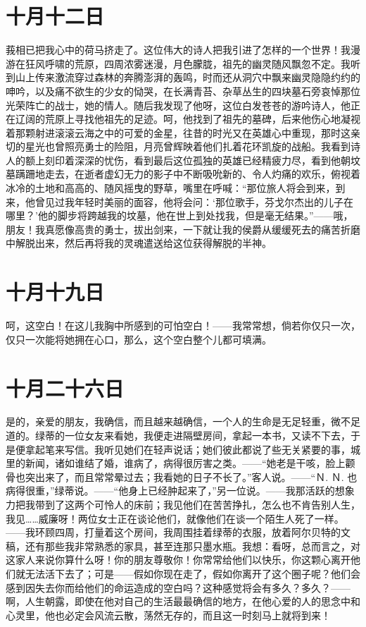 \documentclass[12pt,oneside]{book}
\begin{document}
\chapter{十月十二日}
莪相已把我心中的荷马挤走了。这位伟大的诗人把我引进了怎样的一个世界！我漫游在狂风呼啸的荒原，四周浓雾迷漫，月色朦胧，祖先的幽灵随风飘忽不定。我听到山上传来激流穿过森林的奔腾澎湃的轰鸣，时而还从洞穴中飘来幽灵隐隐约约的呻吟，以及痛不欲生的少女的恸哭，在长满青苔、杂草丛生的四块墓石旁哀悼那位光荣阵亡的战士，她的情人。随后我发现了他呀，这位白发苍苍的游吟诗人，他正在辽阔的荒原上寻找他祖先的足迹。呵，他找到了祖先的墓碑，后来他伤心地凝视着那颗射进滚滚云海之中的可爱的金星，往昔的时光又在英雄心中重现，那时这亲切的星光也曾照亮勇士的险阻，月亮曾辉映着他们扎着花环凯旋的战船。我看到诗人的额上刻印着深深的忧伤，看到最后这位孤独的英雄已经精疲力尽，看到他朝坟墓蹒跚地走去，在逝者虚幻无力的影子中不断吸吮新的、令人灼痛的欢乐，俯视着冰冷的土地和高高的、随风摇曳的野草，嘴里在呼喊：“那位旅人将会到来，到来，他曾见过我年轻时美丽的面容，他将会问：‘那位歌手，芬戈尔杰出的儿子在哪里？’他的脚步将跨越我的坟墓，他在世上到处找我，但是毫无结果。”——哦，朋友！我真愿像高贵的勇士，拔出剑来，一下就让我的侯爵从缓缓死去的痛苦折磨中解脱出来，然后再将我的灵魂遣送给这位获得解脱的半神。
　　

\chapter{十月十九日}
呵，这空白！在这儿我胸中所感到的可怕空白！——我常常想，倘若你仅只一次，仅只一次能将她拥在心口，那么，这个空白整个儿都可填满。
　　
\chapter{十月二十六日}
是的，亲爱的朋友，我确信，而且越来越确信，一个人的生命是无足轻重，微不足道的。绿蒂的一位女友来看她，我便走进隔壁房间，拿起一本书，又读不下去，于是便拿起笔来写信。我听见她们在轻声说话；她们彼此都说了些无关紧要的事，城里的新闻，诸如谁结了婚，谁病了，病得很厉害之类。——“她老是干咳，脸上颧骨也突出来了，而且常常晕过去；我看她的日子不长了。”客人说。——“Ｎ. Ｎ. 也病得很重，”绿蒂说。——“他身上已经肿起来了，”另一位说。——我那活跃的想象力把我带到了这两个可怜人的床前；我见他们在苦苦挣扎，怎么也不肯告别人生，我见……威廉呀！两位女士正在谈论他们，就像他们在谈一个陌生人死了一样。——我环顾四周，打量着这个房间，我周围挂着绿蒂的衣服，放着阿尔贝特的文稿，还有那些我非常熟悉的家具，甚至连那只墨水瓶。我想：看呀，总而言之，对这家人来说你算什么呀！你的朋友尊敬你！你常常给他们以快乐，你这颗心离开他们就无法活下去了；可是——假如你现在走了，假如你离开了这个圈子呢？他们会感到因失去你而给他们的命运造成的空白吗？这种感觉将会有多久？多久？——啊，人生朝露，即使在他对自己的生活最最确信的地方，在他心爱的人的思念中和心灵里，他也必定会风流云散，荡然无存的，而且这一时刻马上就将到来！
　　
\end{document}
